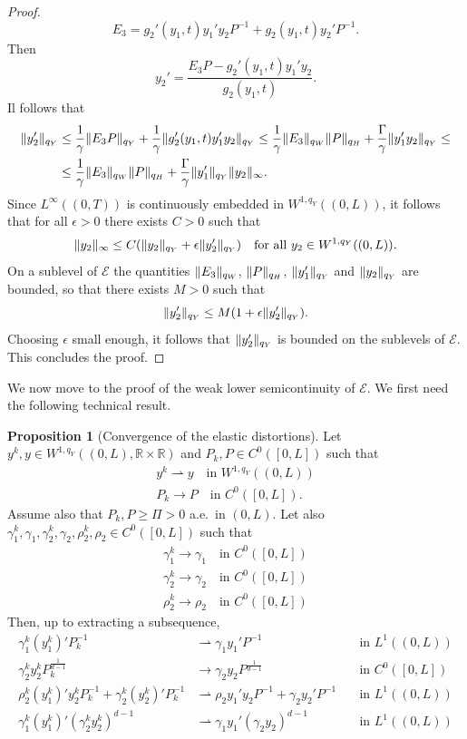 \documentclass[a4paper,10pt,twoside]{amsbook}
\numberwithin{section}{chapter}
\numberwithin{equation}{chapter}
\theoremstyle{definition}
\newtheorem{prop}{Proposition}[chapter]
\DeclarePairedDelimiter{\norm}{\lVert}{\rVert}
\begin{document}
\begin{proof}
\[
E_3=g_2'(y_1,t)y_1'y_2P^{-1}+g_2(y_1,t)y_2'P^{-1}.
\]
Then
\[
y_2'=\frac{E_3P-g_2'(y_1,t)y_1'y_2}{g_2(y_1,t)}.
\]
Il follows that
\[
\begin{split}
\norm{y_2'}_{q_Y}&\le\frac{1}{\gamma}\norm{E_3P}_{q_Y}+\frac{1}{\gamma}\norm{g_2'(y_1,t)y_1'y_2}_{q_Y}\le\frac{1}{\gamma}\norm{E_3}_{q_W}\norm{P}_{q_H}+\frac{\Gamma}{\gamma}\norm{y_1'y_2}_{q_Y}\le\\
&\le\frac{1}{\gamma}\norm{E_3}_{q_W}\norm{P}_{q_H}+\frac{\Gamma}{\gamma}\norm{y_1'}_{q_Y}\norm{y_2}_\infty.
\end{split}
\]
Since $L^\infty((0,T))$ is continuously embedded in $W^{1,q_Y}((0,L))$, it follows that for all $\epsilon>0$ there exists $C>0$ such that
\[
\norm{y_2}_\infty\le C(\norm{y_2}_{q_Y}+\epsilon\norm{y_2'}_{q_Y})\quad\text{for all $y_2\in W^{1,{q_Y}}((0,L))$}.
\]
On a sublevel of $\mathcal{E}$ the quantities $\norm{E_3}_{q_W}$, $\norm{P}_{q_H}$, $\norm{y_1'}_{q_Y}$ and $\norm{y_2}_{q_Y}$ are bounded, so that there exists $M>0$ such that
\[
\norm{y_2'}_{q_Y}\le M(1+\epsilon\norm{y_2'}_{q_Y}).
\]
Choosing $\epsilon$ small enough, it follows that $\norm{y_2'}_{q_Y}$ is bounded on the sublevels of $\mathcal{E}$. This concludes the proof.
\end{proof}
We now move to the proof of the weak lower semicontinuity of $\mathcal E$. We first need the following technical result.
\begin{prop}[Convergence of the elastic distortions]
\label{prop:convergence-minors}
Let $y^k,y\in W^{1,q_Y}((0,L),\mathbb{R}\times\mathbb{R})$ and $P_k,P\in C^0([0,L])$ such that
\begin{gather*}
y^k\rightharpoonup y\quad\text{in $W^{1,q_Y}((0,L))$} \\
P_k\to P\quad\text{in $C^0([0,L])$}.
\end{gather*}
Assume also that $P_k,P\ge \Pi>0$ a.e.\ in $(0,L)$. Let also $\gamma_1^k,\gamma_1,\gamma_2^k,\gamma_2,\rho_2^k,\rho_2\in C^0([0,L])$ such that
\begin{align*}
\gamma_1^k\to\gamma_1\quad\text{in $C^0([0,L])$} \\
\gamma_2^k\to\gamma_2\quad\text{in $C^0([0,L])$} \\
\rho_2^k\to\rho_2\quad\text{in $C^0([0,L])$}
\end{align*}
Then, up to extracting a subsequence,
\begin{align*}
\gamma_1^k(y_1^k)'P_k^{-1}&\rightharpoonup \gamma_1y_1'P^{-1}\quad&\text{in $L^1((0,L))$} \\
\gamma_2^ky_2^kP_k^\frac{1}{d-1}&\to \gamma_2y_2P^\frac{1}{d-1}\quad&\text{in $C^0([0,L])$} \\
\rho_2^k(y_1^k)'y_2^kP_k^{-1}+\gamma_2^k(y_2^k)'P_k^{-1}&\rightharpoonup \rho_2y_1'y_2P^{-1}+\gamma_2y_2'P^{-1}\quad&\text{in $L^1((0,L))$} \\
\gamma_1^k(y_1^k)'(\gamma_2^ky_2^k)^{d-1}&\rightharpoonup \gamma_1y_1'(\gamma_2y_2)^{d-1}\quad&\text{in $L^1((0,L))$}
\end{align*}
\end{prop}
\end{document}
